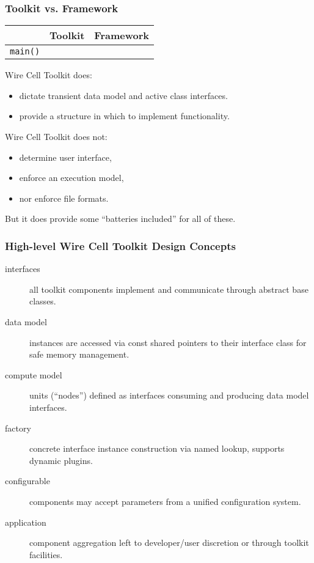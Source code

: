 \documentclass[xcolor=dvipsnames]{beamer}
\newcommand{\cmark}{\ding{51}}%
\newcommand{\xmark}{\ding{55}}%
\begin{document}
\begin{frame}
  \frametitle{Toolkit vs. Framework}
  \begin{center}
    \begin{tabular}[h]{|r|c|c|}
      \hline
      & Toolkit & Framework \\
      \hline
      \texttt{main()} & \xmark & \cmark \\
      \hline
    \end{tabular}
  \end{center}

  \vspace{3mm}

  Wire Cell Toolkit does:
  \begin{itemize}
  \item dictate transient data model and active class interfaces.
  \item provide a structure in which to implement functionality.
  \end{itemize}

  \vspace{3mm}

  Wire Cell Toolkit does not:
  \begin{itemize}
  \item determine user interface, 
  \item enforce an execution model,
  \item nor enforce file formats.
  \end{itemize}
  But it does provide some ``batteries included'' for all of these.
\end{frame}

\begin{frame}[fragile]
  \frametitle{High-level Wire Cell Toolkit Design Concepts}
  \begin{description}
  \item[interfaces] all toolkit components implement and communicate through abstract base classes.
  \item[data model] instances are accessed via const shared pointers to their interface class for safe memory management.
  \item[compute model] units (``nodes'') defined as interfaces consuming and producing data model interfaces.
  \item[factory] concrete interface instance construction via named lookup, supports dynamic plugins.
  \item[configurable] components may accept parameters from a unified configuration system.
  \item[application] component aggregation left to developer/user discretion or through toolkit facilities.
  \end{description}
\end{frame}
\end{document}
